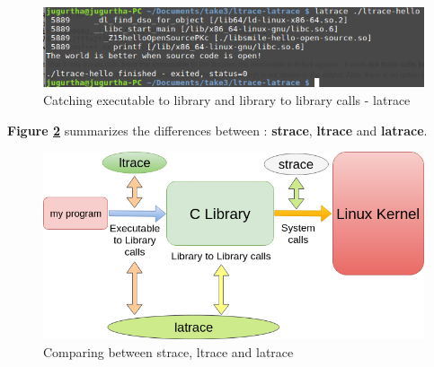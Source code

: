 \begin{itemize}
\begin{center}
\begin{mdframed}
			\begin{figure}[H]
		\centering
        \includegraphics[scale=0.40]{img/solution/latrace-output.png}
        \caption{Catching executable to library and library to library calls - latrace}
        \label{Catching executable to library and library to library calls - latrace}
    \end{figure}
\end{mdframed}
\end{center} 
 
    
    
\end{itemize}





\textbf{Figure \ref{Comparing between strace, ltrace and latrace}} summarizes the differences between : \textbf{strace}, \textbf{ltrace} and \textbf{latrace}. 
\begin{figure}[H]
		\centering
        \includegraphics[scale=0.40]{img/solution/strace-ltrace-latrace.png}
        \caption{Comparing between strace, ltrace and latrace}
        \label{Comparing between strace, ltrace and latrace}
    \end{figure}


